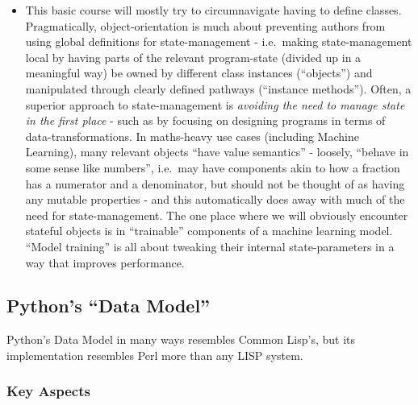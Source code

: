 \documentclass[11pt]{article}
\providecommand{\tightlist}{%
      \setlength{\itemsep}{0pt}\setlength{\parskip}{0pt}}
\begin{document}
\begin{itemize}
  \begin{itemize}
  \tightlist
  \item
    This basic course will mostly try to circumnavigate having to define
    classes. Pragmatically, object-orientation is much about preventing
    authors from using global definitions for state-management -
    i.e.~making state-management local by having parts of the relevant
    program-state (divided up in a meaningful way) be owned by different
    class instances (``objects'') and manipulated through clearly
    defined pathways (``instance methods''). Often, a superior approach
    to state-management is \emph{avoiding the need to manage state in
    the first place} - such as by focusing on designing programs in
    terms of data-transformations. In maths-heavy use cases (including
    Machine Learning), many relevant objects ``have value semantics'' -
    loosely, ``behave in some sense like numbers'', i.e.~may have
    components akin to how a fraction has a numerator and a denominator,
    but should not be thought of as having any mutable properties - and
    this automatically does away with much of the need for
    state-management. The one place where we will obviously encounter
    stateful objects is in ``trainable'' components of a machine
    learning model. ``Model training'' is all about tweaking their
    internal state-parameters in a way that improves performance.
  \end{itemize}
\end{itemize}

    \hypertarget{pythons-data-model}{%
\subsection{Python's ``Data Model''}\label{pythons-data-model}}

    Python's Data Model in many ways resembles Common Lisp's, but its
implementation resembles Perl more than any LISP system.

\hypertarget{key-aspects}{%
\subsubsection{Key Aspects}\label{key-aspects}}
\end{document}
